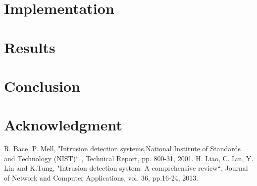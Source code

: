 \documentclass[conference]{IEEEtran}
\begin{document}
\section{Implementation}
\section{Results}
\section{Conclusion}
\section*{Acknowledgment}

\begin{thebibliography}{00}
 R. Bace, P. Mell, "Intrusion detection systems,National Institute of Standards and
Technology (NIST)`` , Technical Report, pp. 800-31, 2001.
 H. Liao, C. Lin, Y. Lin and K.Tung, "Intrusion detection system: A comprehensive review``, Journal of Network and Computer Applications, vol. 36, pp.16-24, 2013.
\end{thebibliography}
\end{document}
